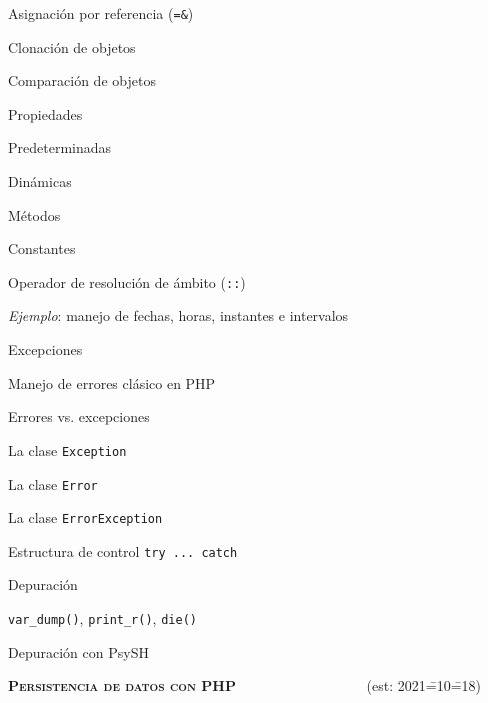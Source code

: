 \begin{longenum}
\begin{longenum}
\begin{longenum}
\begin{longenum}
                \item Asignación por referencia (\texttt{=\&})
            \end{longenum}
            \item Clonación de objetos
            \item Comparación de objetos
            \item Propiedades
            \begin{longenum}
                \item Predeterminadas
                \item Dinámicas
            \end{longenum}
            \item Métodos
            \item Constantes
            \begin{longenum}
                \item Operador de resolución de ámbito (\texttt{::})
            \end{longenum}
            \item \textit{Ejemplo}: manejo de fechas, horas, instantes e intervalos
        \end{longenum}
        \item Excepciones
        \begin{longenum}
            \item Manejo de errores clásico en PHP
            \item Errores vs. excepciones
            \item La clase \texttt{Exception}
            \item La clase \texttt{Error}
            \item La clase \texttt{ErrorException}
            \item Estructura de control \texttt{try ... catch}
        \end{longenum}
        \item Depuración
        \begin{longenum}
            \item \texttt{var\_dump()}, \texttt{print\_r()}, \texttt{die()}
            \item Depuración con PsySH
        \end{longenum}
    \end{longenum}
    \item \textbf{\textsc{Persistencia de datos con PHP}} \ \ \ \ \ \ \ \ \ \ \ \ \ \ \ \ \ \ (est: 2021\==10\==18)

\end{longenum}
